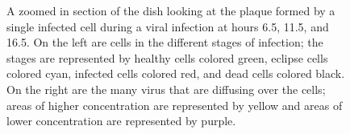 \begin{figure}
\begin{minipage}{0.66\linewidth}
    \vspace{0.25em}
\end{minipage}
\caption{A zoomed in section of the dish looking at the plaque formed by a single infected cell during a viral infection at hours 6.5, 11.5, and 16.5. On the left are cells in the different stages of infection; the stages are represented by healthy cells colored green, eclipse cells colored cyan, infected cells colored red, and dead cells colored black. On the right are the many virus that are diffusing over the cells; areas of higher concentration are represented by yellow and areas of lower concentration are represented by purple. \label{fig_ZoominDish}}
\end{figure}



